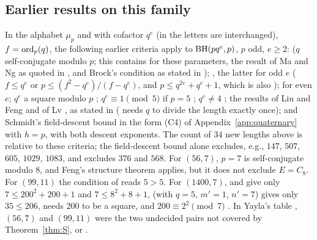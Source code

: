 \subsection{Earlier results on this family}\label{ssec:knownC}
In the alphabet $\mu_p$ and with cofactor $q^e$ (in
\cite{LeungSchmidtZhang2023} the letters are interchanged), $f=\operatorname{ord}_p(q)$,
the following earlier criteria apply to $\operatorname{BH}(pq^e,p)$, $p$ odd, $e\ge2$:
\cite[Thm.~3.3]{DoDuc2019} ($q$ self-conjugate modulo $p$; this contains
\cite[Thms.~5.1(a), 5.3]{LeungSchmidtZhang2023} for these parameters, the
result of Ma and Ng \cite{MaNg2009} as quoted in
\cite[Sect.~1]{Lv2017}, and Brock's condition \cite{Brock1988} as stated in
\cite[Result~1.4]{DoDuc2019});
\cite[Thms.~3.7, 3.11]{DoDuc2019}, the latter for odd $e$ ($f\le q^e$ or
$p\le(f^2-q^e)/(f-q^e)$, and $p\le q^{2e}+q^e+1$, which is also
\cite[Thm.~5.1(b)]{LeungSchmidtZhang2023});
\cite[Thm.~5.4]{LeungSchmidtZhang2023} for even $e$; $q^e$ a square
modulo $p$ \cite[Prop.~8]{Feng2009}; $q^e\equiv1\pmod5$ if $p=5$
\cite[Prop.~5]{Feng2009}; $q^e\ne4$ \cite{FengXiang2008}; the results of
Liu and Feng \cite{LiuFeng2015} and of Lv \cite[Thm.~1.5]{Lv2017}, as
stated in \cite[Sect.~1]{Lv2017} (\cite[Thm.~1.3]{Lv2017} needs $q$ to
divide the length exactly once); and Schmidt's field-descent bound
\cite{Schmidt1999,LeungSchmidt2005} in the form (C4) of
Appendix~\ref{app:quaternary} with $h=p$, with both descent exponents.
The count of $34$ new lengths above is relative to these criteria; the
field-descent bound alone excludes, e.g., $147$, $507$, $605$, $1029$,
$1083$, and \cite[Thm.~3.11(ii)]{DoDuc2019} excludes $376$ and $568$.
For $(56,7)$, $p=7$ is self-conjugate modulo $8$, and Feng's structure
theorem \cite[Thm.~7]{Feng2009} applies, but it does not exclude
$E=C_8$. For $(99,11)$ the condition of
\cite[Thm.~5.4(ii)]{LeungSchmidtZhang2023} reads $5>5$. For $(1400,7)$,
\cite[Thm.~3.11]{DoDuc2019} and \cite[Thm.~5.1(b)]{LeungSchmidtZhang2023}
give only $7\le200^2+200+1$ and $7\le8^2+8+1$,
\cite[Thm.~5.3]{LeungSchmidtZhang2023} (with $q=5$, $m'=1$, $n'=7$) gives
only $35\le206$, \cite[Thm.~5.4]{LeungSchmidtZhang2023} needs $200$ to be
a square, and $200\equiv2^2\pmod7$ .
In Yayla's table \cite{Yayla2016}, $(56,7)$ and $(99,11)$ were the two
undecided pairs not covered by Theorem~\ref{thm:S},
\cite{FengXiang2008} or \cite[Thm.~6.5]{LeungSchmidtZhang2023}.
